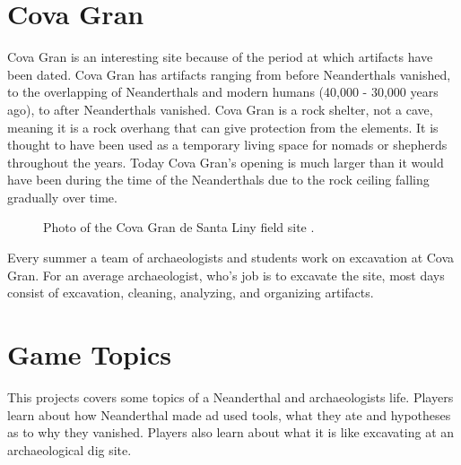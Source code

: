 \section{Cova Gran}
Cova Gran is an interesting site because of the period at which artifacts have been dated. Cova Gran has artifacts ranging from before Neanderthals vanished, to the overlapping of Neanderthals and modern humans (40,000 - 30,000 years ago), to after Neanderthals vanished. Cova Gran is a rock shelter, not a cave, meaning it is a rock overhang that can give protection from the elements. It is thought to have been used as a temporary living space for nomads or shepherds throughout the years. Today Cova Gran's opening is much larger than it would have been during the time of the Neanderthals due to the rock ceiling falling gradually over time.    
\begin{figure}[!ht]
	\begin{center}
	\end{center}
	\caption{Photo of the Cova Gran de Santa Liny field site \cite{CovaGran}.} \label{fig:CovaGrab}
\end{figure}  


Every summer a team of archaeologists and students work on excavation at Cova Gran. For an average archaeologist, who's job is to excavate the site, most days consist of excavation, cleaning, analyzing, and organizing artifacts. 

\section{Game Topics}
This projects covers some topics of a Neanderthal and archaeologists life. Players learn about how Neanderthal made ad used tools, what they ate and hypotheses as to why they vanished. Players also learn about what it is like excavating at an archaeological dig site.  
 





